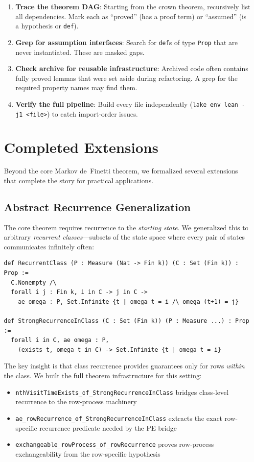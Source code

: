 \documentclass[11pt,a4paper]{article}
\theoremstyle{definition}
\begin{document}
\begin{enumerate}
\item \textbf{Trace the theorem DAG}: Starting from the crown theorem,
  recursively list all dependencies. Mark each as ``proved'' (has a
  proof term) or ``assumed'' (is a hypothesis or \texttt{def}).
\item \textbf{Grep for assumption interfaces}: Search for \texttt{def}s
  of type \texttt{Prop} that are never instantiated. These are masked
  gaps.
\item \textbf{Check archive for reusable infrastructure}: Archived code
  often contains fully proved lemmas that were set aside during
  refactoring. A grep for the required property names may find them.
\item \textbf{Verify the full pipeline}: Build every file independently
  (\texttt{lake env lean -j1 <file>}) to catch import-order issues.
\end{enumerate}

\section{Completed Extensions}
\label{sec:extensions}

Beyond the core Markov de~Finetti theorem, we formalized several extensions
that complete the story for practical applications.

\subsection{Abstract Recurrence Generalization}

The core theorem requires recurrence to the \emph{starting state}. We
generalized this to arbitrary \emph{recurrent classes}---subsets of the state
space where every pair of states communicates infinitely often:

\begin{lstlisting}
def RecurrentClass (P : Measure (Nat -> Fin k)) (C : Set (Fin k)) : Prop :=
  C.Nonempty /\
  forall i j : Fin k, i in C -> j in C ->
    ae omega : P, Set.Infinite {t | omega t = i /\ omega (t+1) = j}

def StrongRecurrenceInClass (C : Set (Fin k)) (P : Measure ...) : Prop :=
  forall i in C, ae omega : P,
    (exists t, omega t in C) -> Set.Infinite {t | omega t = i}
\end{lstlisting}

The key insight is that class recurrence provides guarantees only for rows
\emph{within} the class. We built the full theorem infrastructure for this
setting:
\begin{itemize}
\item \texttt{nthVisitTimeExists\_of\_StrongRecurrenceInClass} bridges
  class-level recurrence to the row-process machinery
\item \texttt{ae\_rowRecurrence\_of\_StrongRecurrenceInClass} extracts the
  exact row-specific recurrence predicate needed by the PE bridge
\item \texttt{exchangeable\_rowProcess\_of\_rowRecurrence} proves row-process
  exchangeability from the row-specific hypothesis
\end{itemize}
\end{document}
